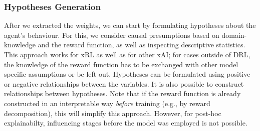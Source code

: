 \subsubsection{\textbf{Hypotheses Generation}}
After we extracted the weights, we can start by formulating hypotheses about the agent's behaviour. For this, we consider causal presumptions based on domain-knowledge and the reward function, as well as inspecting descriptive statistics. This approach works for xRL as well as for other xAI; for cases outside of DRL, the knowledge of the reward function has to be exchanged with other model specific assumptions or be left out.
Hypotheses can be formulated using positive or negative relationships between the variables. It is also possible to construct relationships between hypotheses.
Note that if the reward function is already constructed in an interpretable way \textit{before} training (e.g., by reward decomposition), this will simplify this approach. However, for post-hoc explainabilty, influencing stages before the model was employed is not possible.

